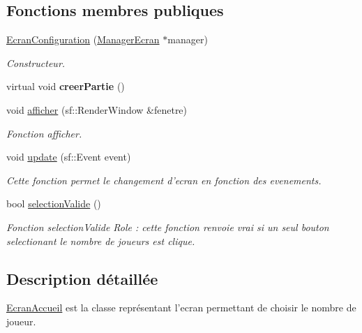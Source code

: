 \subsection*{\-Fonctions membres publiques}
\begin{DoxyCompactItemize}
\item 
\hypertarget{classEcranConfiguration_a40ba51dbd89594164d32ba0dbff817f2}{\hyperlink{classEcranConfiguration_a40ba51dbd89594164d32ba0dbff817f2}{\-Ecran\-Configuration} (\hyperlink{classManagerEcran}{\-Manager\-Ecran} $\ast$manager)}\label{classEcranConfiguration_a40ba51dbd89594164d32ba0dbff817f2}

\begin{DoxyCompactList}\small\item\em \-Constructeur. \end{DoxyCompactList}\item 
\hypertarget{classEcranConfiguration_aa65dbd2aca4c0b3853aea5eb8c92b98f}{virtual void {\bfseries creer\-Partie} ()}\label{classEcranConfiguration_aa65dbd2aca4c0b3853aea5eb8c92b98f}

\item 
void \hyperlink{classEcranConfiguration_ab1a7fd161795e7dd28e359f5b8bb25f7}{afficher} (sf\-::\-Render\-Window \&fenetre)
\begin{DoxyCompactList}\small\item\em \-Fonction afficher. \end{DoxyCompactList}\item 
void \hyperlink{classEcranConfiguration_af6827f55a832c0ea0b8e580e68fc7503}{update} (sf\-::\-Event event)
\begin{DoxyCompactList}\small\item\em \-Cette fonction permet le changement d'ecran en fonction des evenements. \end{DoxyCompactList}\item 
bool \hyperlink{classEcranConfiguration_a72a91a3f504c3047694e06c826c7ee7d}{selection\-Valide} ()
\begin{DoxyCompactList}\small\item\em \-Fonction selection\-Valide \-Role \-: cette fonction renvoie vrai si un seul bouton selectionant le nombre de joueurs est clique. \end{DoxyCompactList}\end{DoxyCompactItemize}


\subsection{\-Description détaillée}
\hyperlink{classEcranAccueil}{\-Ecran\-Accueil} est la classe représentant l'ecran permettant de choisir le nombre de joueur. 


